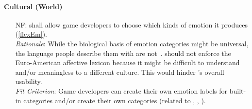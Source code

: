\paragraph{Cultural (World)}
\noindent \begin{itemize}[wide=0pt, leftmargin=*]

    \item[NF\refstepcounter{nfnum}\thenfnum \label{N_ChooseEm}:] \progname{}
    shall allow game developers to choose which kinds of emotion it produces
    (\ref{flexEm}). \vspace*{1mm}\\
    \textit{Rationale}: While the biological basis of emotion categories might
    be universal, the language people describe them with are
    not~\citep[p.~115--122]{oatley1992best}. \progname{} should not enforce the
    Euro-American affective lexicon because it might be difficult to understand
    and/or meaningless to a different culture. This would hinder \progname{}'s
    overall usability. \vspace*{1mm}\\
    \textit{Fit Criterion}: Game developers can create their own emotion labels
    for built-in categories and/or create their own categories (related to
    , ,
    ).
\end{itemize}

